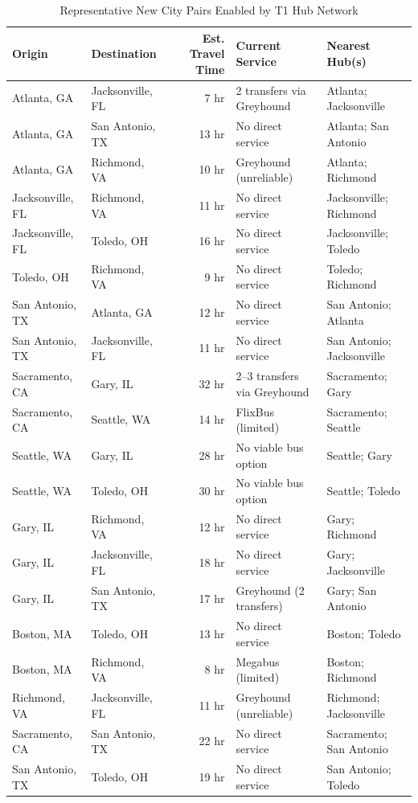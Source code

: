 \begin{table}[h]
\centering
\caption{Representative New City Pairs Enabled by T1 Hub Network}
\label{tab:pairs}
\begin{tabular}{llrll}
\toprule
Origin & Destination & Est. Travel Time & Current Service & Nearest Hub(s) \\
\midrule
Atlanta, GA & Jacksonville, FL & 7 hr & 2 transfers via Greyhound & Atlanta; Jacksonville \\
Atlanta, GA & San Antonio, TX & 13 hr & No direct service & Atlanta; San Antonio \\
Atlanta, GA & Richmond, VA & 10 hr & Greyhound (unreliable) & Atlanta; Richmond \\
Jacksonville, FL & Richmond, VA & 11 hr & No direct service & Jacksonville; Richmond \\
Jacksonville, FL & Toledo, OH & 16 hr & No direct service & Jacksonville; Toledo \\
Toledo, OH & Richmond, VA & 9 hr & No direct service & Toledo; Richmond \\
San Antonio, TX & Atlanta, GA & 12 hr & No direct service & San Antonio; Atlanta \\
San Antonio, TX & Jacksonville, FL & 11 hr & No direct service & San Antonio; Jacksonville \\
Sacramento, CA & Gary, IL & 32 hr & 2--3 transfers via Greyhound & Sacramento; Gary \\
Sacramento, CA & Seattle, WA & 14 hr & FlixBus (limited) & Sacramento; Seattle \\
Seattle, WA & Gary, IL & 28 hr & No viable bus option & Seattle; Gary \\
Seattle, WA & Toledo, OH & 30 hr & No viable bus option & Seattle; Toledo \\
Gary, IL & Richmond, VA & 12 hr & No direct service & Gary; Richmond \\
Gary, IL & Jacksonville, FL & 18 hr & No direct service & Gary; Jacksonville \\
Gary, IL & San Antonio, TX & 17 hr & Greyhound (2 transfers) & Gary; San Antonio \\
Boston, MA & Toledo, OH & 13 hr & No direct service & Boston; Toledo \\
Boston, MA & Richmond, VA & 8 hr & Megabus (limited) & Boston; Richmond \\
Richmond, VA & Jacksonville, FL & 11 hr & Greyhound (unreliable) & Richmond; Jacksonville \\
Sacramento, CA & San Antonio, TX & 22 hr & No direct service & Sacramento; San Antonio \\
San Antonio, TX & Toledo, OH & 19 hr & No direct service & San Antonio; Toledo \\
\bottomrule
\end{tabular}
\end{table}

